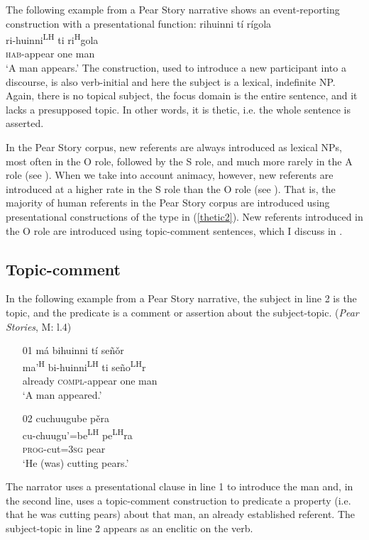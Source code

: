 The following example from a Pear Story narrative shows an event-reporting construction with a presentational function:
\ea\label{thetic2} 
\glll rihuinni t\'{i} r\'{i}gola  \\
ri-huinni\textsuperscript{LH} ti ri\textsuperscript{H}gola  \\
\textsc{hab}-appear one man  \\
\glt `A man appears.' 
\z
The construction, used to introduce a new participant into a discourse, is also verb-initial and here the subject is a lexical, indefinite NP. Again, there is no topical subject, the focus domain is the entire sentence, and it lacks a presupposed topic. In other words, it is thetic, i.e. the whole sentence is asserted. 

In the Pear Story corpus, new referents are always introduced as lexical NPs, most often in the O role, followed by the S role, and much more rarely in the A role (see ). When we take into account animacy, however, new referents are introduced at a higher rate in the S role than the O role (see ). That is, the majority of human referents in the Pear Story corpus are introduced using presentational constructions of the type in (\ref{thetic2}). New referents introduced in the O role are introduced using topic-comment sentences, which I discuss in .


\subsection{Topic-comment}\label{topiccommentsection}

In the following example from a Pear Story narrative, the subject in line 2 is the topic, and the predicate is a comment or assertion about the subject-topic. 
\ea\label{TC} (\textit{Pear Stories}, M: l.4)
\begin{itemize}
\item[01]
\glll m\'{a} bihuinni t\'{i} se\~{n}\v{o}r \\
ma'\textsuperscript{H} bi-huinni\textsuperscript{LH} ti se\~{n}o\textsuperscript{LH}r \\
already \textsc{compl}-appear one man \\
\glt `A man appeared.' 


\item[02]
\glll cuchuugube p\v{e}ra \\
cu-chuugu'=be\textsuperscript{LH} pe\textsuperscript{LH}ra \\
\textsc{prog}-cut=\textsc{3sg} pear \\
\glt `He (was) cutting pears.' 

\end{itemize}
\z
The narrator uses a presentational clause in line 1 to introduce the man and, in the second line, uses a topic-comment construction to predicate a property (i.e. that he was cutting pears) about that man, an already established referent. The subject-topic in line 2 appears as an enclitic on the verb. 

